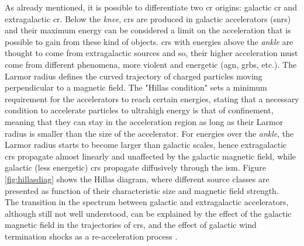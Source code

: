 \documentclass[main.tex]{subfiles}
\begin{document}
    As already mentioned, it is possible to differentiate two \gls{cr} origins: galactic \gls{cr} and extragalactic \gls{cr}. Below the \textit{knee}, \glspl{cr} are produced in galactic accelerators (\glspl{snr}) and their maximum energy can be considered a limit on the acceleration that is possible to gain from these kind of objects. \glspl{cr} with energies above the \textit{ankle} are thought to come from extragalactic sources and so, their higher acceleration must come from different phenomena, more violent and energetic (\gls{agn}, \glspl{grb}, etc.). The Larmor radius defines the curved trajectory of charged particles moving perpendicular to a magnetic field. The "Hillas condition" \cite{1984hillascondition} sets a minimum requirement for the accelerators to reach certain energies, stating that a necessary condition to accelerate particles to ultrahigh energy is that of confinement, meaning that they can stay in the acceleration region as long as their Larmor radius is smaller than the size of the accelerator. For energies over the \textit{ankle}, the Larmor radius starts to become larger than galactic scales, hence extragalactic \glspl{cr} propagate almost linearly and unaffected by the galactic magnetic field, while galactic (less energetic) \glspl{cr} propagate diffusively through the \gls{ism}. Figure \ref{fig:hillasdiag} shows the Hillas diagram, where different source classes are presented as function of their characteristic size and magnetic field strength.\\
The transition in the spectrum between galactic and extragalactic accelerators, although still not well understood, can be explained by the effect of the galactic magnetic field in the trajectories of \glspl{cr}, and the effect of galactic wind termination shocks as a re-acceleration process \cite{2016CRSpectrum}.
\end{document}
